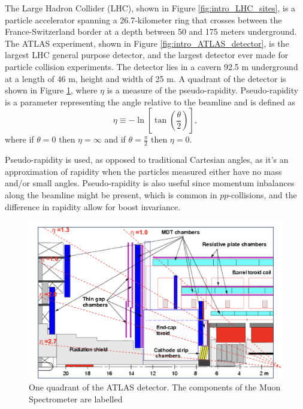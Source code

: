 The Large Hadron Collider (LHC), shown in Figure \ref{fig:intro_LHC_sites},  is a particle accelerator spanning a 26.7-kilometer ring that crosses between the France-Switzerland border at a depth between 50 and 175 meters underground.\cite{Bruning:782076}
The ATLAS experiment, shown in Figure \ref{fig:intro_ATLAS_detector}, is the largest LHC general purpose detector, and the largest detector ever made for particle collision experiments. 
The detector lies in a cavern 92.5 m underground at a length of 46 m, height and width of 25 m.\cite{ATLAS_Tech_Proposal}
A quadrant of the detector is shown in Figure \ref{fig:ATLAS_quadrant}, where $\eta$ is a measure of the pseudo-rapidity.
Pseudo-rapidity is a parameter representing the angle relative to the beamline and is defined as
\begin{equation}
    \eta \equiv -\ln\left[ \tan\left(\frac{\theta}{2}\right)\right],
\end{equation}  
where if $\theta = 0$ then $\eta = \infty$ and if $\theta = \frac{\pi}{2}$ then $\eta = 0$.


Pseudo-rapidity is used, as opposed to traditional Cartesian angles, as it's an approximation of rapidity when the particles measured either have no mass and/or small angles. 
Pseudo-rapidity is also useful since momentum inbalances along the beamline might be present, which is common in $pp$-collisions, and the difference in rapidity allow for boost invariance.      
\begin{figure}[h!]
    \centering
    \vspace{20px}
    \includegraphics[width=.8\textwidth]{content/img/ATLAS qudrant labelled MS.png}
    \caption{One quadrant of the ATLAS detector. The components of the Muon Spectrometer are labelled \cite{Hough_Transform_CSC}}
    \vspace{20px}
    \label{fig:ATLAS_quadrant}
\end{figure}

